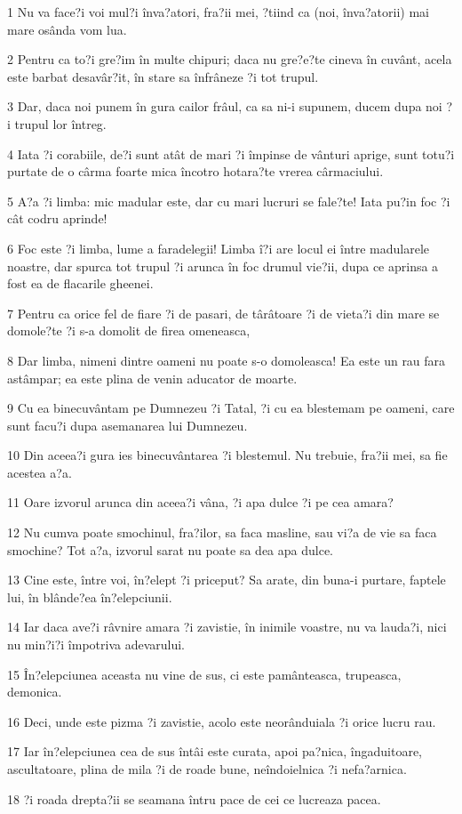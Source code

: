 \par 1 Nu va face?i voi mul?i înva?atori, fra?ii mei, ?tiind ca (noi, înva?atorii) mai mare osânda vom lua.
\par 2 Pentru ca to?i gre?im în multe chipuri; daca nu gre?e?te cineva în cuvânt, acela este barbat desavâr?it, în stare sa înfrâneze ?i tot trupul.
\par 3 Dar, daca noi punem în gura cailor frâul, ca sa ni-i supunem, ducem dupa noi ?i trupul lor întreg.
\par 4 Iata ?i corabiile, de?i sunt atât de mari ?i împinse de vânturi aprige, sunt totu?i purtate de o cârma foarte mica încotro hotara?te vrerea cârmaciului.
\par 5 A?a ?i limba: mic madular este, dar cu mari lucruri se fale?te! Iata pu?in foc ?i cât codru aprinde!
\par 6 Foc este ?i limba, lume a faradelegii! Limba î?i are locul ei între madularele noastre, dar spurca tot trupul ?i arunca în foc drumul vie?ii, dupa ce aprinsa a fost ea de flacarile gheenei.
\par 7 Pentru ca orice fel de fiare ?i de pasari, de târâtoare ?i de vieta?i din mare se domole?te ?i s-a domolit de firea omeneasca,
\par 8 Dar limba, nimeni dintre oameni nu poate s-o domoleasca! Ea este un rau fara astâmpar; ea este plina de venin aducator de moarte.
\par 9 Cu ea binecuvântam pe Dumnezeu ?i Tatal, ?i cu ea blestemam pe oameni, care sunt facu?i dupa asemanarea lui Dumnezeu.
\par 10 Din aceea?i gura ies binecuvântarea ?i blestemul. Nu trebuie, fra?ii mei, sa fie acestea a?a.
\par 11 Oare izvorul arunca din aceea?i vâna, ?i apa dulce ?i pe cea amara?
\par 12 Nu cumva poate smochinul, fra?ilor, sa faca masline, sau vi?a de vie sa faca smochine? Tot a?a, izvorul sarat nu poate sa dea apa dulce.
\par 13 Cine este, între voi, în?elept ?i priceput? Sa arate, din buna-i purtare, faptele lui, în blânde?ea în?elepciunii.
\par 14 Iar daca ave?i râvnire amara ?i zavistie, în inimile voastre, nu va lauda?i, nici nu min?i?i împotriva adevarului.
\par 15 În?elepciunea aceasta nu vine de sus, ci este pamânteasca, trupeasca, demonica.
\par 16 Deci, unde este pizma ?i zavistie, acolo este neorânduiala ?i orice lucru rau.
\par 17 Iar în?elepciunea cea de sus întâi este curata, apoi pa?nica, îngaduitoare, ascultatoare, plina de mila ?i de roade bune, neîndoielnica ?i nefa?arnica.
\par 18 ?i roada drepta?ii se seamana întru pace de cei ce lucreaza pacea.

